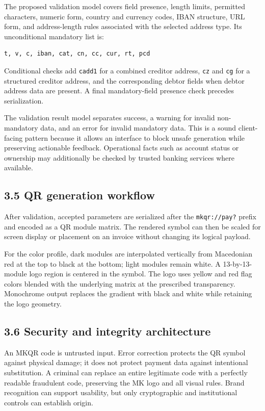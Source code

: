 The proposed validation model covers field presence, length limits, permitted characters, numeric form, country and currency codes, IBAN structure, URL form, and address-length rules associated with the selected address type. Its unconditional mandatory list is:

\begin{verbatim}
t, v, c, iban, cat, cn, cc, cur, rt, pcd
\end{verbatim}

Conditional checks add \texttt{cadd1} for a combined creditor address, \texttt{cz} and \texttt{cg} for a structured creditor address, and the corresponding debtor fields when debtor address data are present. A final mandatory-field presence check precedes serialization.

The validation result model separates success, a warning for invalid non-mandatory data, and an error for invalid mandatory data. This is a sound client-facing pattern because it allows an interface to block unsafe generation while preserving actionable feedback. Operational facts such as account status or ownership may additionally be checked by trusted banking services where available.

\subsection{3.5 QR generation workflow}

After validation, accepted parameters are serialized after the \texttt{mkqr://pay?} prefix and encoded as a QR module matrix. The rendered symbol can then be scaled for screen display or placement on an invoice without changing its logical payload.

For the color profile, dark modules are interpolated vertically from Macedonian red at the top to black at the bottom; light modules remain white. A 13-by-13-module logo region is centered in the symbol. The logo uses yellow and red flag colors blended with the underlying matrix at the prescribed transparency. Monochrome output replaces the gradient with black and white while retaining the logo geometry.

\subsection{3.6 Security and integrity architecture}

An MKQR code is untrusted input. Error correction protects the QR symbol against physical damage; it does not protect payment data against intentional substitution. A criminal can replace an entire legitimate code with a perfectly readable fraudulent code, preserving the MK logo and all visual rules. Brand recognition can support usability, but only cryptographic and institutional controls can establish origin.

